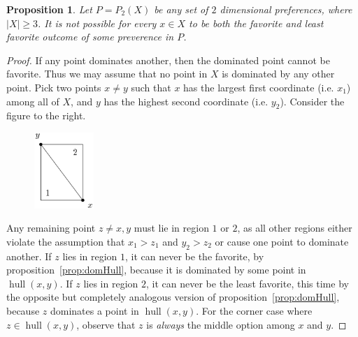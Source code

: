 \documentclass[12pt]{article}
\newtheorem{proposition}[theorem]{Proposition}
\DeclareMathOperator*{\hull}{hull}
\newcommand{\1}[1]{\mathds{1}[{#1}]}
\begin{document}
    \begin{proposition}\label{prop:noAllBestWorst}
      Let $P = P_2(X)$ be any set of $2$ dimensional preferences,
      where $|X| \ge 3$.
      It is not possible for every $x\in X$ to be both the
      favorite and least favorite outcome of some preverence in $P$.
    \end{proposition}
    \begin{proof}
      If any point dominates another, then the dominated point cannot be favorite.
      Thus we may assume that no point in $X$ is dominated
      by any other point. Pick two points $x \ne y$ such that $x$ has the largest
      first coordinate (i.e. $x_1$) among all of $X$, and $y$ has the highest second
      coordinate (i.e. $y_2$).
      Consider the figure to the right.
      \begin{figure}
        \begin{center}
          \includegraphics[width=0.2\textwidth]{figures/noBestWorst}
        \end{center}
      \end{figure}
      Any remaining point $z\ne x,y$ must lie in region $1$ or $2$, as all other
      regions either violate the assumption that $x_1 > z_1$ and $y_2 > z_2$
      or cause one point to dominate another.
      If $z$ lies in region $1$, it can never be the favorite, by
      proposition~\ref{prop:domHull}, because it is dominated by some point in
      $\hull(x,y)$.
      If $z$ lies in region $2$, it can never be the least favorite, this time
      by the opposite but completely analogous version of 
      proposition~\ref{prop:domHull}, because $z$ dominates a point in $\hull(x,y)$.
      For the corner case where $z\in\hull(x,y)$, observe that $z$ is
      \emph{always} the middle option among $x$ and $y$.
    \end{proof}
\end{document}
